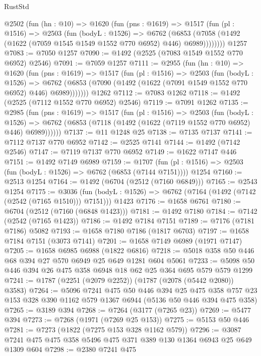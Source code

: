 \begin{lexlean}{RustStd}
\begin{coremodule}
    @2502
      (fun (hn : @10) =>
      @1620
        (fun (pns : @1619) =>
        @1517
          (fun (pl : @1516) =>
          @2503
            (fun (bodyL : @1526) =>
            @6762
              (@6853 (@7058 (@1492 (@1622 (@7059 @1545 @1549 @1552 @770 @6952) @446) @6989))))))))
    @1257
@7083 := @7050 @1257
@7090 := @1492 (@2525 (@7083 @1549 @1552 @770 @6952) @2546)
@7091 := @7059 @1257
@7111 := @2955
    (fun (hn : @10) =>
    @1620
      (fun (pns : @1619) =>
      @1517
        (fun (pl : @1516) =>
        @2503
          (fun (bodyL : @1526) =>
          @6762 (@6853 (@7090 (@1492 (@1622 (@7091 @1549 @1552 @770 @6952) @446) @6989)))))))
    @1262
@7112 := @7083 @1262
@7118 := @1492 (@2525 (@7112 @1552 @770 @6952) @2546)
@7119 := @7091 @1262
@7135 := @2985
    (fun (pns : @1619) =>
    @1517
      (fun (pl : @1516) =>
      @2503
        (fun (bodyL : @1526) =>
        @6762 (@6853 (@7118 (@1492 (@1622 (@7119 @1552 @770 @6952) @446) @6989))))))
@7137 := @11 @1248 @25
@7138 := @7135 @7137
@7141 := @7112 @7137 @770 @6952
@7142 := @2525 @7141
@7144 := @1492 (@7142 @2546)
@7147 := @7119 @7137 @770 @6952
@7149 := @1622 @7147 @446
@7151 := @1492 @7149 @6989
@7159 := @1707
    (fun (pl : @1516) => @2503 (fun (bodyL : @1526) => @6762 (@6853 (@7144 @7151))))
    @1254
@7160 := @2513 @1254
@7164 := @1492 (@6704 (@2512 (@7160 @6849)))
@7165 := @2543 @1254
@7175 := @3036
    (fun (bodyL : @1526) => @6762 (@7164 (@1492 (@7142 (@2542 (@7165 @1510))) @7151)))
    @1423
@7176 := @1658 @6761
@7180 := @6704 (@2512 (@7160 (@6848 @1423)))
@7181 := @1492 @7180
@7184 := @7142 (@2542 (@7165 @1423))
@7186 := @1492 @7184 @7151
@7189 := @7176 (@7181 @7186) @5082
@7193 := @1658 @7180 @7186 (@1817 @6703)
@7197 := @1658 @7184 @7151 (@3073 @7141)
@7201 := @1658 @7149 @6989 (@1971 @7147)
@7205 := @1658 @6985 @6988 (@1822 @6816)
@7218 := @5018 @358 @50 @446 @68 @394 @27 @570 @6949 @25 @649 @1281 @604 @5061
@7233 := @5098 @50 @446 @394 @26 @475 @358 @6948 @18 @62 @25 @364 @695 @579 @579 @1299
@7241 := @1787 (@2251 (@2079 @2252)) (@1787 (@2078 (@5442 @2080)) @3583)
@7264 := @5096
    @7241
    @475
    @50
    @446
    @394
    @25
    @475
    @358
    @757
    @23
    @153
    @328
    @390
    @1162
    @579
    @1367
    @6944
    (@5136 @50 @446 @394 @475 @358)
@7265 := @3189 @394
@7268 := @7264 (@3177 (@7265 @23))
@7269 := @5477 @394
@7273 := @7268 (@1971 (@7269 @25 @153))
@7275 := @5153 @50 @446
@7281 := @7273 (@1822 (@7275 @153 @328 @1162 @579))
@7296 := @3087 @7241 @475 @475 @358 @5496 @475 @371 @389 @130 @1364 @6943 @25 @649 @1309 @604
@7298 := @2380 @7241 @475

\end{coremodule}
\end{lexlean}
